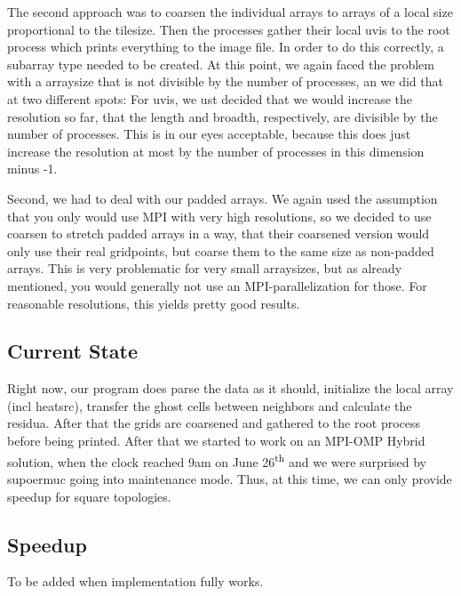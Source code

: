 The second approach was to coarsen the individual arrays to arrays of a local size proportional to the tilesize. Then the processes gather their local uvis to the root process which prints everything to the image file. 
In order to do this correctly, a subarray type needed to be created. At this point, we again faced the problem with a arraysize that is not divisible by the number of processes, an we did that at two different spots: For uvis, we ust decided that we would increase the resolution so far, that the length and broadth, respectively, are divisible by the number of processes. This is in our eyes acceptable, because this does just increase the resolution at most by the number of processes in this dimension minus -1.

Second, we had to deal with our padded arrays. We again used the assumption that you only would use MPI with very high resolutions, so we decided to use coarsen to stretch padded arrays in a way, that their coarsened version would only use their real gridpoints, but coarse them to the same size as non-padded arrays. This is very problematic for very small arraysizes, but as already mentioned, you would generally not use an MPI-parallelization for those. For reasonable resolutions, this yields pretty good results.

\subsection*{Current State}
Right now, our program does parse the data as it should, initialize the local array (incl heatsrc), transfer the ghost cells between neighbors and calculate the residua. After that the grids are coarsened and gathered to the root process before being printed.
After that we started to work on an MPI-OMP Hybrid solution, when the clock reached 9am on June 26\textsuperscript{th} and we were surprised by supoermuc going into maintenance mode. Thus, at this time, we can only provide speedup for square topologies.


\subsection*{Speedup}

To be added when implementation fully works.

